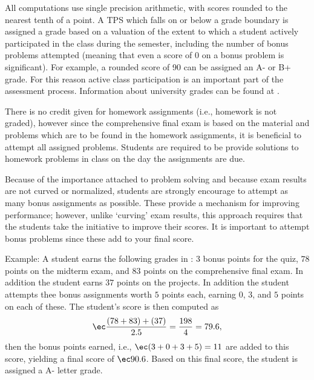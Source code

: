 All computations use single precision arithmetic, with scores rounded
to the nearest tenth of a point.
A TPS which falls on or below a grade boundary is assigned 
a grade based on a valuation of the extent to which a student
actively participated in the class
during the semester, including the number of bonus problems attempted
(meaning that even a score of 0 on a bonus problem is significant).
For example, a rounded score of 90 can be assigned an A- or B+ grade.
For this reason active class participation is an important part of the
assessment process.
Information about university grades can be found at \Urls{\GradepolicyURL}.

There is no credit
given for homework assignments (i.e., homework is not graded),
however since the comprehensive
final exam is based on the material and problems which are to be found in the
homework assignments, it is beneficial to attempt all assigned problems.
Students are required to be provide solutions to homework problems in class
on the day the assignments are due.

Because of the importance
attached to problem solving and because exam results are
not curved or normalized, students are strongly encourage to
attempt as many bonus assignments as possible. These provide a mechanism for
improving performance; however, unlike `curving' exam results, this approach
requires that the students take the initiative to improve their scores.
It is important to attempt bonus problems since these add to your final
score.

\smallskip
Example: A student earns the following grades in \Course: $3$ bonus points for
the quiz, $78$ points on the midterm exam,
and $83$ points on the comprehensive final exam.
In addition the student
earns $37$ points on the projects. In addition
the student attempts thee bonus assignments worth $5$ points each, earning
$0$, $3$, and $5$ points on each of these. The student's score is then computed as
%
%
%
\begin{equation*}
\ec
\frac{(78 + 83) + (37)}{2.5} = \frac{198}{4} = 79.6,
\end{equation*}
%
%
%
then the bonus points earned, i.e., $\ec (3 + 0+ 3 + 5) = 11$ are added to
this score, yielding a final score of $\ec 90.6$.
Based on this final score, the student is assigned a {\ec A-} letter grade.

